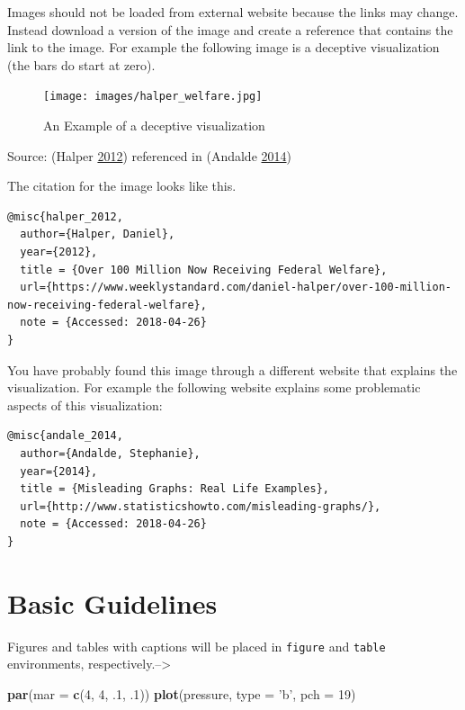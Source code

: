 \documentclass[]{book}
\newenvironment{Shaded}{\begin{snugshade}}{\end{snugshade}}
\newcommand{\DataTypeTok}[1]{\textcolor[rgb]{0.13,0.29,0.53}{#1}}
\newcommand{\DecValTok}[1]{\textcolor[rgb]{0.00,0.00,0.81}{#1}}
\newcommand{\FloatTok}[1]{\textcolor[rgb]{0.00,0.00,0.81}{#1}}
\newcommand{\KeywordTok}[1]{\textcolor[rgb]{0.13,0.29,0.53}{\textbf{#1}}}
\newcommand{\NormalTok}[1]{#1}
\newcommand{\StringTok}[1]{\textcolor[rgb]{0.31,0.60,0.02}{#1}}
\begin{document}
Images should not be loaded from external website because the links may change. Instead download a version of the image and create a reference that contains the link to the image. For example the following image is a deceptive visualization (the bars do start at zero).

\begin{figure}
\centering
\texttt{[image: images/halper\_welfare.jpg]}
\caption{An Example of a deceptive visualization}
\end{figure}

Source: (Halper \protect\hyperlink{ref-halper_2012}{2012}) referenced in (Andalde \protect\hyperlink{ref-andale_2014}{2014})

The citation for the image looks like this.

\begin{verbatim}
@misc{halper_2012,
  author={Halper, Daniel},
  year={2012},
  title = {Over 100 Million Now Receiving Federal Welfare},
  url={https://www.weeklystandard.com/daniel-halper/over-100-million-now-receiving-federal-welfare},
  note = {Accessed: 2018-04-26}
}
\end{verbatim}

You have probably found this image through a different website that explains the visualization. For example the following website explains some problematic aspects of this visualization:

\begin{verbatim}
@misc{andale_2014,
  author={Andalde, Stephanie},
  year={2014},
  title = {Misleading Graphs: Real Life Examples},
  url={http://www.statisticshowto.com/misleading-graphs/},
  note = {Accessed: 2018-04-26}
}
\end{verbatim}

\hypertarget{basic-guidelines}{%
\section{Basic Guidelines}\label{basic-guidelines}}

Figures and tables with captions will be placed in \texttt{figure} and \texttt{table} environments, respectively.--\textgreater{}

\begin{Shaded}
\begin{Highlighting}[]
\KeywordTok{par}\NormalTok{(}\DataTypeTok{mar =} \KeywordTok{c}\NormalTok{(}\DecValTok{4}\NormalTok{, }\DecValTok{4}\NormalTok{, }\FloatTok{.1}\NormalTok{, }\FloatTok{.1}\NormalTok{))}
\KeywordTok{plot}\NormalTok{(pressure, }\DataTypeTok{type =} \StringTok{'b'}\NormalTok{, }\DataTypeTok{pch =} \DecValTok{19}\NormalTok{)}
\end{Highlighting}
\end{Shaded}
\end{document}
